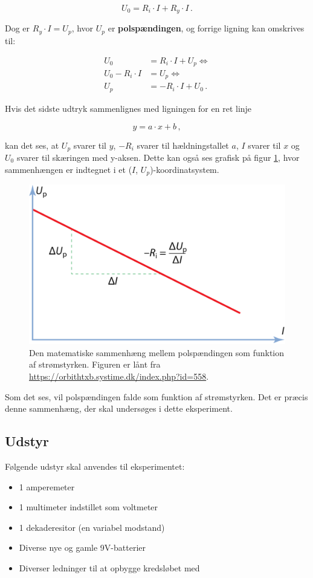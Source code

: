 \documentclass[a4paper, 12pt]{article}
\begin{document}
$$U_0 = R_i \cdot I + R_y \cdot I \,.$$

Dog er \(R_y \cdot I = U_p\), hvor \(U_p\) er \textbf{polspændingen}, og forrige ligning kan omskrives til:

\begin{align*}
    U_0 &= R_i \cdot I + U_p \iff \\
    U_0 - R_i \cdot I &= U_p \iff \\
    U_p &= - R_i \cdot I + U_0 \,.
\end{align*}

Hvis det sidste udtryk sammenlignes med ligningen for en ret linje

$$y = a \cdot x + b \,,$$

kan det ses, at \(U_p\) svarer til \(y\), \(-R_i\) svarer til hældningstallet \(a\), \(I\) svarer til \(x\) og \(U_0\) svarer til skæringen med y-aksen. Dette kan også ses grafisk på figur \ref{forsoeg_3_2}, hvor sammenhængen er indtegnet i et (\(I\), \(U_p\))-koordinatsystem.

\begin{figure}[htbp]
\centering
\includegraphics[width=0.6\linewidth]{./img/forsoeg_3_2.png}
\caption{\label{forsoeg_3_2}Den matematiske sammenhæng mellem polspændingen som funktion af strømstyrken. Figuren er lånt fra \url{https://orbithtxb.systime.dk/index.php?id=558}.}
\end{figure}

Som det ses, vil polspændingen falde som funktion af strømstyrken.
Det er præcis denne sammenhæng, der skal undersøges i dette eksperiment.

\subsection{Udstyr}
\label{sec:org97971dc}

Følgende udstyr skal anvendes til eksperimentet:

\begin{itemize}[noitemsep]
\item 1 amperemeter
\item 1 multimeter indstillet som voltmeter
\item 1 dekaderesitor (en variabel modstand)
\item Diverse nye og gamle 9V-batterier
\item Diverser ledninger til at opbygge kredsløbet med
\end{itemize}
\end{document}
